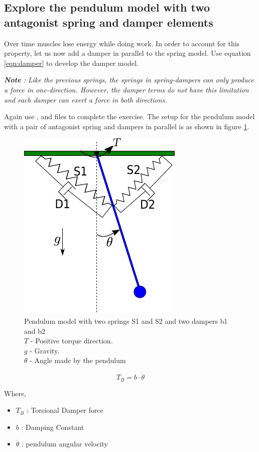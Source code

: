 \documentclass{cmc}
\begin{document}
\newpage

\subsection*{Explore the pendulum model with two antagonist spring and damper elements}
Over time muscles lose energy while doing work. In order to account
for this property, let us now add a damper in parallel to the spring
model. Use equation \ref{eqn:damper} to develop the damper model.

\textit{\textbf{Note} : Like the previous springs, the springs in spring-dampers
  can only produce a force in one-direction.  However, the damper terms do not
  have this limitation and each damper can exert a force in both directions.}

Again use ,  and
 files to complete the exercise. The
setup for the pendulum model with a pair of antagonist spring and
dampers in parallel is as shown in figure
\ref{fig:pendulum_spring_damper}.


\begin{figure}[H]
  \centering
  \includegraphics[width=.3\textwidth]{figures/pendulum_spring_damper}
  \caption[pendulum with spring]{Pendulum model with two springs S1
    and S2 and two dampers b1 and b2\\
    $T$ - Positive torque direction.\\
    $g$ - Gravity.\\
    $\theta$ - Angle made by the pendulum}
  \label{fig:pendulum_spring_damper}
\end{figure}



\begin{equation}
  \label{eqn:damper}
  T_{B} = b \cdot \dot{\theta}
\end{equation}

Where,
\begin{itemize}
\item $T_{B}$ : Torsional Damper force
\item $b$ : Damping Constant
\item $\dot{\theta}$ : pendulum angular velocity
\end{itemize}
\end{document}
